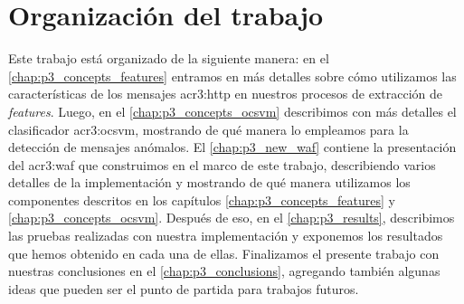 \section{Organización del trabajo}

Este trabajo está organizado de la siguiente manera:
en el \autoref{chap:p3_concepts_features} entramos en más detalles sobre
cómo utilizamos las características de los mensajes \gls{acr3:http} en
nuestros procesos de extracción de \textit{features}.
Luego, en el \autoref{chap:p3_concepts_ocsvm} describimos con más detalles
el clasificador \gls{acr3:ocsvm}, mostrando de qué manera lo empleamos
para la detección de mensajes anómalos.
El \autoref{chap:p3_new_waf} contiene la presentación del \gls{acr3:waf}
que construimos en el marco de este trabajo, describiendo varios detalles
de la implementación y mostrando de qué manera utilizamos los componentes
descritos en los capítulos \ref{chap:p3_concepts_features} y
\ref{chap:p3_concepts_ocsvm}.
Después de eso, en el \autoref{chap:p3_results}, describimos las pruebas
realizadas con nuestra implementación y exponemos los resultados que hemos
obtenido en cada una de ellas.
Finalizamos el presente trabajo con nuestras conclusiones en el
\autoref{chap:p3_conclusions}, agregando también algunas ideas que pueden
ser el punto de partida para trabajos futuros.
